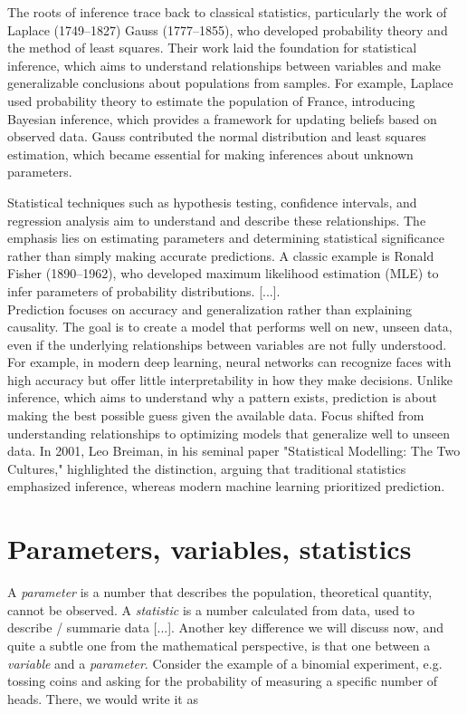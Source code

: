 \documentclass{book}
\begin{document}
The roots of inference trace back to classical statistics, particularly the work of Laplace (1749–1827) Gauss (1777–1855), who developed probability theory and the method of least squares. Their work laid the foundation for statistical inference, which aims to understand relationships between variables and make generalizable conclusions about populations from samples. For example, Laplace used probability theory to estimate the population of France, introducing Bayesian inference, which provides a framework for updating beliefs based on observed data. Gauss contributed the normal distribution and least squares estimation, which became essential for making inferences about unknown parameters.

Statistical techniques such as hypothesis testing, confidence intervals, and regression analysis aim to understand and describe these relationships. The emphasis lies on estimating parameters and determining statistical significance rather than simply making accurate predictions. A classic example is Ronald Fisher (1890–1962), who developed maximum likelihood estimation (MLE) to infer parameters of probability distributions. [...].\\

Prediction focuses on accuracy and generalization rather than explaining causality. The goal is to create a model that performs well on new, unseen data, even if the underlying relationships between variables are not fully understood. For example, in modern deep learning, neural networks can recognize faces with high accuracy but offer little interpretability in how they make decisions. Unlike inference, which aims to understand why a pattern exists, prediction is about making the best possible guess given the available data. Focus shifted from understanding relationships to optimizing models that generalize well to unseen data. In 2001, Leo Breiman, in his seminal paper "Statistical Modelling: The Two Cultures," highlighted the distinction, arguing that traditional statistics emphasized inference, whereas modern machine learning prioritized prediction.\\

\section{Parameters, variables, statistics}

A \textit{parameter} is a number that describes the population, theoretical quantity, cannot be observed. A \textit{statistic} is a number calculated from data, used to describe / summarie data [...]. Another key difference we will discuss now, and quite a subtle one from the mathematical perspective, is that one between a \textit{variable} and a \textit{parameter}. Consider the example of a binomial experiment, e.g. tossing coins and asking for the probability of measuring a specific number of heads. There, we would write it as 
\end{document}
